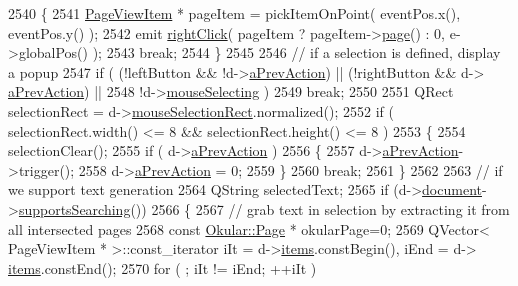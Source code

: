\begin{DoxyCode}
2540             \{
2541                 \hyperlink{classPageViewItem}{PageViewItem} * pageItem = pickItemOnPoint( eventPos.x(), eventPos.y() );
2542                 emit \hyperlink{classPageView_a51ac8814a8f47fd02ac0b61627ad164f}{rightClick}( pageItem ? pageItem->\hyperlink{classPageViewItem_a5c512d95e5563e8d19d1fb3d93dafc31}{page}() : 0, e->globalPos() );
2543                 \textcolor{keywordflow}{break};
2544             \}
2545 
2546             \textcolor{comment}{// if a selection is defined, display a popup}
2547             \textcolor{keywordflow}{if} ( (!leftButton && !d->\hyperlink{classPageViewPrivate_a63b5ccd8ed0f4ac9a89c040aeb3173a9}{aPrevAction}) || (!rightButton && d->
      \hyperlink{classPageViewPrivate_a63b5ccd8ed0f4ac9a89c040aeb3173a9}{aPrevAction}) ||
2548                  !d->\hyperlink{classPageViewPrivate_a8819b152a8279b75359af2a3e0567681}{mouseSelecting} )
2549                 \textcolor{keywordflow}{break};
2550 
2551             QRect selectionRect = d->\hyperlink{classPageViewPrivate_a94473cb593838a977bea89214bd1ef66}{mouseSelectionRect}.normalized();
2552             \textcolor{keywordflow}{if} ( selectionRect.width() <= 8 && selectionRect.height() <= 8 )
2553             \{
2554                 selectionClear();
2555                 \textcolor{keywordflow}{if} ( d->\hyperlink{classPageViewPrivate_a63b5ccd8ed0f4ac9a89c040aeb3173a9}{aPrevAction} )
2556                 \{
2557                     d->\hyperlink{classPageViewPrivate_a63b5ccd8ed0f4ac9a89c040aeb3173a9}{aPrevAction}->trigger();
2558                     d->\hyperlink{classPageViewPrivate_a63b5ccd8ed0f4ac9a89c040aeb3173a9}{aPrevAction} = 0;
2559                 \}
2560                 \textcolor{keywordflow}{break};
2561             \}
2562 
2563             \textcolor{comment}{// if we support text generation}
2564             QString selectedText;
2565             \textcolor{keywordflow}{if} (d->\hyperlink{classPageViewPrivate_a50645b9853306cffd74e51efb677e5b4}{document}->\hyperlink{classOkular_1_1Document_acadcf633db6332012dbbd1914fddd0c9}{supportsSearching}())
2566             \{
2567                 \textcolor{comment}{// grab text in selection by extracting it from all intersected pages}
2568                 \textcolor{keyword}{const} \hyperlink{classOkular_1_1Page}{Okular::Page} * okularPage=0;
2569                 QVector< PageViewItem * >::const\_iterator iIt = d->\hyperlink{classPageViewPrivate_ad90c795dead9abfaa5818a94e00435bc}{items}.constBegin(), iEnd = d->
      \hyperlink{classPageViewPrivate_ad90c795dead9abfaa5818a94e00435bc}{items}.constEnd();
2570                 \textcolor{keywordflow}{for} ( ; iIt != iEnd; ++iIt )

\end{DoxyCode}
